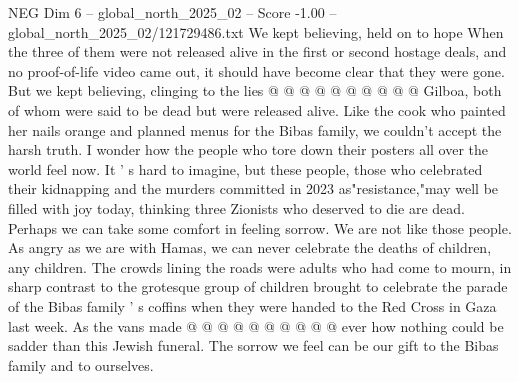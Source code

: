 \begin{textsample}{NEG Dim 6 – global\_north\_2025\_02 – Score -1.00 – global\_north\_2025\_02/121729486.txt}
We kept believing, held on to hope When the three of them were not released alive in the first or second hostage deals, and no proof-of-life video came out, it should have become clear that they were gone.
But we kept believing, clinging to the lies @ @ @ @ @ @ @ @ @ @ Gilboa, both of whom were said to be dead but were released alive.
Like the cook who painted her nails orange and planned menus for the Bibas family, we couldn't accept the harsh truth.
I wonder how the people who tore down their posters all over the world feel now.
It ' s hard to imagine, but these people, those who celebrated their kidnapping and the murders committed in 2023 as"resistance,"may well be filled with joy today, thinking three Zionists who deserved to die are dead.
Perhaps we can take some comfort in feeling sorrow.
We are not like those people.
As angry as we are with Hamas, we can never celebrate the deaths of children, any children.
The crowds lining the roads were adults who had come to mourn, in sharp contrast to the grotesque group of children brought to celebrate the parade of the Bibas family ' s coffins when they were handed to the Red Cross in Gaza last week.
As the vans made @ @ @ @ @ @ @ @ @ @ ever how nothing could be sadder than this Jewish funeral.
The sorrow we feel can be our gift to the Bibas family and to ourselves.

\end{textsample}
